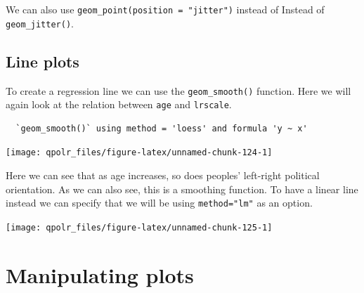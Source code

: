 \documentclass[12pt,oneside]{reedthesis}
\theoremstyle{definition}
\theoremstyle{definition}
\theoremstyle{definition}
\theoremstyle{remark}
\begin{document}
  We can also use \texttt{geom\_point(position\ =\ "jitter")} instead of
  Instead of \texttt{geom\_jitter()}.
  
  \subsection{Line plots}\label{line-plots}
  
  To create a regression line we can use the \texttt{geom\_smooth()}
  function. Here we will again look at the relation between \texttt{age}
  and \texttt{lrscale}.
  \begin{Shaded}
  \begin{Highlighting}[]
  \NormalTok{(}\OperatorTok{+}
  \StringTok{  }\NormalTok{()}
  \end{Highlighting}
  \end{Shaded}
  \begin{verbatim}
  `geom_smooth()` using method = 'loess' and formula 'y ~ x'
  \end{verbatim}
  \begin{center}\texttt{[image: qpolr\_files/figure-latex/unnamed-chunk-124-1]} \end{center}
  
  Here we can see that as age increases, so does peoples' left-right
  political orientation. As we can also see, this is a smoothing function.
  To have a linear line instead we can specify that we will be using
  \texttt{method="lm"} as an option.
  \begin{Shaded}
  \begin{Highlighting}[]
  \NormalTok{(}\OperatorTok{+}
  \StringTok{  }\NormalTok{(}\NormalTok{)}
  \end{Highlighting}
  \end{Shaded}
  \begin{center}\texttt{[image: qpolr\_files/figure-latex/unnamed-chunk-125-1]} \end{center}
  
  \section{Manipulating plots}\label{manipulating-plots}
  
\end{document}
